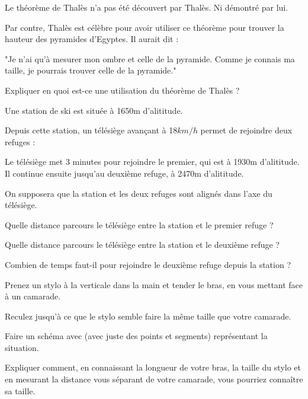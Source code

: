

Le théorème de Thalès n'a pas été découvert par Thalès. Ni démontré par lui.

Par contre, Thalès est célèbre pour avoir utiliser ce théorème pour trouver la hauteur des pyramides d'Egyptes. Il aurait dit :

"Je n'ai qu'à mesurer mon ombre et celle de la pyramide. Comme je connais ma taille, je pourrais trouver celle de la pyramide."

Expliquer en quoi est-ce une utilisation du théorème de Thalès ?


Une station de ski est située à 1650m d'alititude. 

Depuis cette station, un télésiège avançant à 18$km/h$ permet de rejoindre deux refuges : 

Le télésiège met 3 minutes pour rejoindre le premier, qui est à 1930m d'alititude. Il continue ensuite jusqu'au deuxième refuge, à 2470m d'alititude.

On supposera que la station et les deux refuges sont alignés dans l'axe du télésiège.

\cnt Quelle distance parcours le télésiège entre la station et le premier refuge ?

\cnt Quelle distance parcours le télésiège entre la station et le deuxième refuge ?

\cnt Combien de temps faut-il pour rejoindre le deuxième refuge depuis la station ?




Prenez un stylo à la verticale dans la main et tender le bras, en vous mettant face à un camarade. 

Reculez jusqu'à ce que le stylo semble faire la même taille que votre camarade.

\cnt Faire un schéma avec (avec juste des points et segments) représentant la situation.

\cnt Expliquer comment, en connaissant la longueur de votre bras, la taille du stylo et en mesurant la distance vous séparant de votre camarade, vous pourriez connaître sa taille.